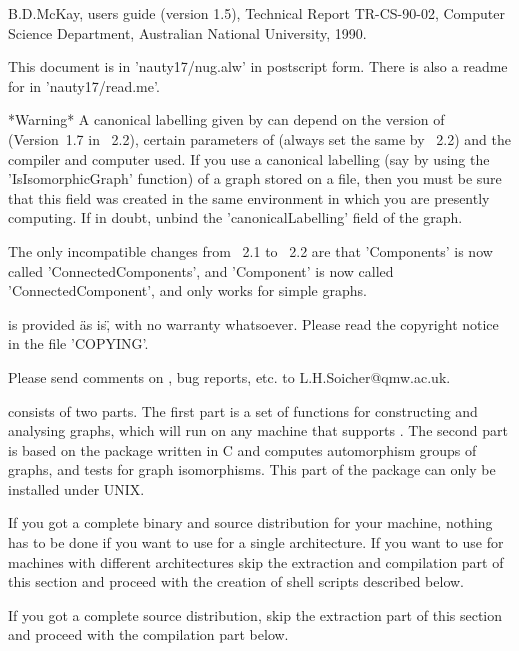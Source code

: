 B.D.McKay,   {\nauty}  users  guide  (version   1.5),  Technical   Report
TR-CS-90-02, Computer Science Department, Australian National University,
1990.

This document is in 'nauty17/nug.alw' in  postscript form.  There is also
a readme for {\nauty} in 'nauty17/read.me'.

*Warning*  A canonical  labelling  given  by  {\nauty} can  depend on the
version of  {\nauty}  (Version~1.7 in  {\GRAPE}~2.2),  certain parameters
of {\nauty} (always set  the  same  by {\GRAPE}~2.2) and the compiler and 
computer used.  If  you  use  a  canonical labelling  (say by  using  the 
'IsIsomorphicGraph' function) of  a graph stored on a file, then you must  
be sure that this field  was created in the same environment in which you 
are  presently  computing.  If in doubt, unbind the  'canonicalLabelling' 
field of the graph.

The only incompatible changes from  {\GRAPE}~2.1 to {\GRAPE}~2.2 are that
'Components' is now called 'ConnectedComponents',  and 'Component' is now
called 'ConnectedComponent', and only works for simple graphs.

{\GRAPE} is provided \"as is\", with no warranty whatsoever.  Please read 
the  copyright  notice  in the file 'COPYING'.

Please   send   comments    on   {\GRAPE},   bug    reports,   etc.    to
L.H.Soicher@qmw.ac.uk.


{\GRAPE} consists  of  two  parts.  The first  part  is  a set of  {\GAP}
functions  for constructing and analysing  graphs,  which will run on any
machine that supports  {\GAP}.  The second part is  based on the {\nauty}
package written  in C  and  computes automorphism  groups of  graphs, and
tests  for graph isomorphisms.  This  part  of the  package  can only  be
installed under UNIX.

If you  got a complete binary and  source distribution for  your machine,
nothing   has to be   done  if you  want   to use {\GRAPE}  for  a single
architecture.  If you  want to  use  {\GRAPE} for machines with different
architectures  skip the extraction and   compilation part of this section
and proceed with the creation of shell scripts described below.

If you  got a complete source distribution,  skip the  extraction part of
this section and proceed with the compilation part below.

